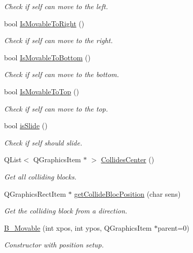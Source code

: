 \begin{DoxyCompactItemize}
\begin{DoxyCompactList}\small\item\em Check if self can move to the left. \end{DoxyCompactList}\item 
bool \hyperlink{class_b___movable_a134b648413c6d27c008f8a0655ffa0f9}{Is\+Movable\+To\+Right} ()
\begin{DoxyCompactList}\small\item\em Check if self can move to the right. \end{DoxyCompactList}\item 
bool \hyperlink{class_b___movable_a190fdc076141ae6698334bfe4dfd61a3}{Is\+Movable\+To\+Bottom} ()
\begin{DoxyCompactList}\small\item\em Check if self can move to the bottom. \end{DoxyCompactList}\item 
bool \hyperlink{class_b___movable_a68bb6a98d031f9495cdeb80b9aa325c4}{Is\+Movable\+To\+Top} ()
\begin{DoxyCompactList}\small\item\em Check if self can move to the top. \end{DoxyCompactList}\item 
bool \hyperlink{class_b___movable_a44d1413ec8bceda3b1a50c673b429d03}{is\+Slide} ()
\begin{DoxyCompactList}\small\item\em Check if self should slide. \end{DoxyCompactList}\item 
Q\+List$<$ Q\+Graphics\+Item $\ast$ $>$ \hyperlink{class_b___movable_a081e4e71fb9483330f3315e6b32bbcbb}{Collides\+Center} ()
\begin{DoxyCompactList}\small\item\em Get all colliding blocks. \end{DoxyCompactList}\item 
Q\+Graphics\+Rect\+Item $\ast$ \hyperlink{class_b___movable_a4cb26e3d494505eaaa6773c0a448c479}{get\+Collide\+Bloc\+Position} (char sens)
\begin{DoxyCompactList}\small\item\em Get the colliding block from a direction. \end{DoxyCompactList}\item 
\hyperlink{class_b___movable_ac874fc12d19502117d0bfc396d1059d2}{B\+\_\+\+Movable} (int xpos, int ypos, Q\+Graphics\+Item $\ast$parent=0)
\begin{DoxyCompactList}\small\item\em Constructor with position setup. \end{DoxyCompactList}\item 

\end{DoxyCompactItemize}
